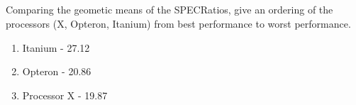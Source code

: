 \documentclass{article}
\begin{document}
\subsection{} 
Comparing the geometic means of the SPECRatios, give an ordering of the processors (X, Opteron, Itanium) from best performance to worst performance.

\begin{enumerate} 
	\item Itanium - 27.12
	\item Opteron - 20.86
	\item Processor X - 19.87
\end{enumerate}
\pagebreak
\section{}
\end{document}
